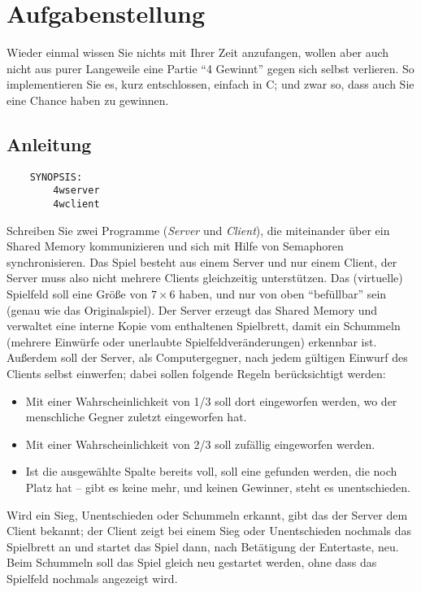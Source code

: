 




\section*{Aufgabenstellung}

Wieder einmal wissen Sie nichts mit Ihrer Zeit anzufangen, wollen aber auch
nicht aus purer Langeweile eine Partie "`4 Gewinnt"' gegen sich selbst
verlieren. So implementieren Sie es, kurz entschlossen, einfach in C; und zwar
so, dass auch Sie eine Chance haben zu gewinnen.

\subsection*{Anleitung}

\begin{verbatim}
    SYNOPSIS:
        4wserver
        4wclient
\end{verbatim}

Schreiben Sie zwei Programme (\emph{Server} und \emph{Client}), die miteinander
über ein Shared Memory kommunizieren und sich mit Hilfe von Semaphoren
synchronisieren. Das Spiel besteht aus einem Server und nur einem Client, der
Server muss also nicht mehrere Clients gleichzeitig unterstützen. Das
(virtuelle) Spielfeld soll eine Größe von $7\times 6$ haben, und nur von oben
"`befüllbar"' sein (genau wie das Originalspiel). Der Server erzeugt das Shared
Memory und verwaltet eine interne Kopie vom enthaltenen Spielbrett, damit ein
Schummeln (mehrere Einwürfe oder unerlaubte Spielfeldveränderungen) erkennbar
ist. Außerdem soll der Server, als Computergegner, nach jedem gültigen Einwurf
des Clients selbst einwerfen; dabei sollen folgende Regeln berücksichtigt
werden:

\begin{itemize}
\item Mit einer Wahrscheinlichkeit von 1/3 soll dort eingeworfen werden, wo der
menschliche Gegner zuletzt eingeworfen hat.
\item Mit einer Wahrscheinlichkeit von 2/3 soll zufällig eingeworfen werden.
\item Ist die ausgewählte Spalte bereits voll, soll eine gefunden werden, die
noch Platz hat -- gibt es keine mehr, und keinen Gewinner, steht es
unentschieden.
\end{itemize}

Wird ein Sieg, Unentschieden oder Schummeln erkannt, gibt das der Server dem
Client bekannt; der Client zeigt bei einem Sieg oder Unentschieden nochmals das
Spielbrett an und startet das Spiel dann, nach Betätigung der Entertaste, neu.
Beim Schummeln soll das Spiel gleich neu gestartet werden, ohne dass das
Spielfeld nochmals angezeigt wird.

